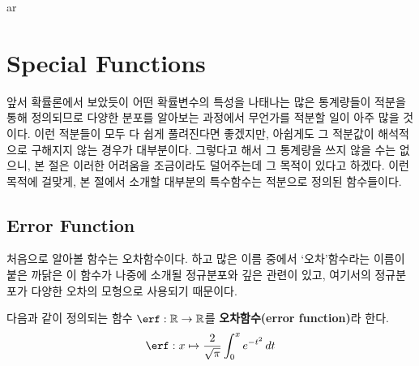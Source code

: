 ar\section{Special Functions}

앞서 확률론에서 보았듯이 어떤 확률변수의 특성을 나태나는 많은 통계량들이 적분을 통해 정의되므로 다양한 분포를 알아보는 과정에서 무언가를 적분할 일이 아주 많을 것이다. 이런 적분들이 모두 다 쉽게 풀려진다면 좋겠지만, 아쉽게도 그 적분값이 해석적으로 구해지지 않는 경우가 대부분이다. 그렇다고 해서 그 통계량을 쓰지 않을 수는 없으니, 본 절은 이러한 어려움을 조금이라도 덜어주는데 그 목적이 있다고 하겠다. 이런 목적에 걸맞게, 본 절에서 소개할 대부분의 특수함수는 적분으로 정의된 함수들이다.

\subsection{Error Function}

처음으로 알아볼 함수는 오차함수이다. 하고 많은 이름 중에서 `오차'함수라는 이름이 붙은 까닭은 이 함수가 나중에 소개될 정규분포와 깊은 관련이 있고, 여기서의 정규분포가 다양한 오차의 모형으로 사용되기 때문이다.

\begin{definition}
    다음과 같이 정의되는 함수 $\erf:\mathbb{R}\to\mathbb{R}$를 \textbf{오차함수(error function)}라 한다.
    \begin{equation*}
        \erf:x\mapsto\frac{2}{\sqrt{\pi}}\int_0^xe^{-t^2}\,dt
    \end{equation*}
\end{definition}


